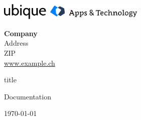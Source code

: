 \includegraphics[width=7cm]{ubique-logo.png}
	\hspace{4.3cm}
 {\raggedleft
	 \textbf{Company} \\
	\hspace{11.5cm} Address \\
	ZIP \\
\vspace{0.3cm}
	\url{www.example.ch } 
\par}
	\vspace{3cm}
	{\Huge {{title}} \par}
	\vspace{1.5cm}
	{\huge Documentation \par}
	\vspace{3cm}
	{ \large \today }